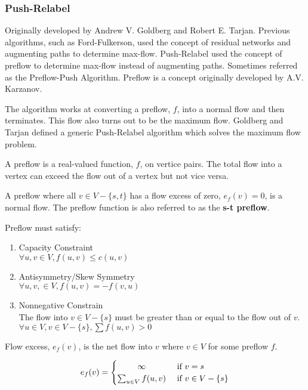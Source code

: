 
\subsubsection{Push-Relabel}
Originally developed by Andrew V. Goldberg and Robert E. Tarjan. Previous algorithms, such as Ford-Fulkerson, used the concept of residual networks and augmenting paths to determine max-flow.
Push-Relabel used the concept of preflow to determine  max-flow instead of augmenting paths. Sometimes referred as the Preflow-Push Algorithm.
Preflow is a concept originally developed by A.V. Karzanov.

The algorithm works at converting a preflow, $f$, into a normal flow and then terminates. This flow also turns out to be the maximum flow. Goldberg and Tarjan defined a generic Push-Relabel algorithm  which solves the maximum flow problem.

\begin{definition}[Preflow]
	A preflow is a real-valued function, $f$, on vertice pairs. The total flow into a vertex can exceed the flow out of a vertex but not vice versa.
\end{definition}
A preflow where all $v \in V-\{s, t\}$ has a flow excess of zero, $e_f(v) = 0$, is a normal flow. The preflow function is also referred to as the \textbf{s-t preflow}.

Preflow must satisfy:
\begin{enumerate}
	\item Capacity Constraint\\
	$\forall u,v \in V, f(u,v) \leq c(u,v)$
	
	\item Antisymmetry/Skew Symmetry\\
	$\forall u, v, \in V, f(u,v) = -f(v,u)$
	
	\item Nonnegative Constrain\\
	The flow into $v \in V-\{s\}$ must be greater than or equal to the flow out of $v$. $\forall u \in V, v \in V-\{s\}, \sum f(u,v)>0$
\end{enumerate}

\begin{definition}
	Flow excess, $e_f(v)$, is the net flow into $v$ where $v \in V$ for some preflow $f$.
\end{definition}

\[
e_f(v) =
\begin{cases} 
\hfill \infty \hfill & \text{ if $v=s$} \\
\hfill \sum_{u \in V}f(u,v) \hfill & \text{ if $v \in V-\{s\}$} \\
\end{cases}
\]

